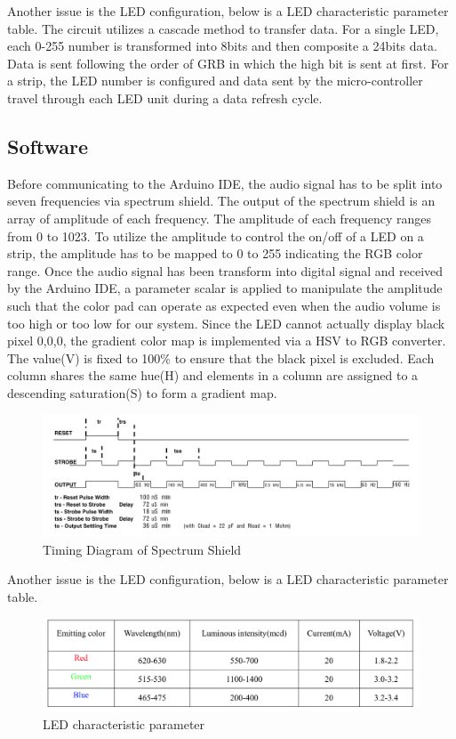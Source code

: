 \documentclass[12pt,a4paper,journal]{IEEEtran}
\begin{document}
Another issue is the LED configuration, below is a LED characteristic parameter table. The circuit utilizes a cascade method to transfer data. For a single LED, each 0-255 number is transformed into 8bits and then composite a 24bits data. Data is sent following the order of GRB in which the high bit is sent at first. For a strip, the LED number is configured and data sent by the micro-controller travel through each LED unit during a data refresh cycle.\subsection{Software}
Before communicating to the Arduino IDE, the audio signal has to be split into seven frequencies via spectrum shield. The output of the spectrum shield is an array of amplitude of each frequency. The amplitude of each frequency ranges from 0 to 1023. To utilize the amplitude to control the on/off of a LED on a strip, the amplitude has to be mapped to 0 to 255 indicating the RGB color range. Once the audio signal has been transform into digital signal and received by the Arduino IDE, a parameter scalar is applied to manipulate the amplitude such that the color pad can operate as expected even when the audio volume is too high or too low for our system. Since the LED cannot actually display black pixel {0,0,0}, the gradient color map is implemented via a HSV to RGB converter. The value(V) is fixed to 100\% to ensure that the black pixel is excluded. Each column shares the same hue(H) and elements in a column are assigned to a descending saturation(S) to form a gradient map.
\begin{figure}
  \centering
  \includegraphics[width=0.7\linewidth]{timing1.png}
  \caption{Timing Diagram of Spectrum Shield}
  \label{fig:sstd1}
\end{figure}
Another issue is the LED configuration, below is a LED characteristic parameter table.
\begin{figure}
  \centering
  \includegraphics[width=0.7\linewidth]{ledparameter.png}
  \caption{LED characteristic parameter}
  \label{fig:ledcp}
\end{figure}
\end{document}
